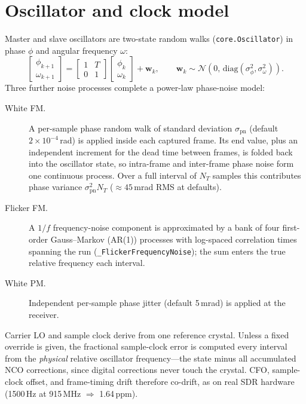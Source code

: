 \documentclass[10pt]{article}
\newcommand{\code}[1]{\texttt{#1}}
\begin{document}
\section{Oscillator and clock model}
Master and slave oscillators are two-state random walks
(\code{core.Oscillator}) in phase $\phi$ and angular frequency $\omega$:
\begin{equation}
\begin{bmatrix}\phi_{k+1}\\ \omega_{k+1}\end{bmatrix} =
\begin{bmatrix}1 & T\\ 0 & 1\end{bmatrix}
\begin{bmatrix}\phi_{k}\\ \omega_{k}\end{bmatrix} + \mathbf{w}_k ,
\qquad \mathbf{w}_k \sim \mathcal{N}(0,\,\mathrm{diag}(\sigma_\phi^2, \sigma_\omega^2)).
\end{equation}
Three further noise processes complete a power-law phase-noise model:
\begin{description}
\item[White FM.] A per-sample phase random walk of standard deviation
$\sigma_{\mathrm{pn}}$ (default $2\times10^{-4}$\,rad) is applied inside each
captured frame. Its end value, plus an independent increment for the dead
time between frames, is folded back into the oscillator state, so intra-frame
and inter-frame phase noise form one continuous process. Over a full interval
of $N_T$ samples this contributes phase variance
$\sigma_{\mathrm{pn}}^2 N_T$ ($\approx 45$\,mrad RMS at defaults).
\item[Flicker FM.] A $1/f$ frequency-noise component is approximated by a
bank of four first-order Gauss--Markov (AR(1)) processes with log-spaced
correlation times spanning the run (\code{\_FlickerFrequencyNoise}); the sum
enters the true relative frequency each interval.
\item[White PM.] Independent per-sample phase jitter (default 5\,mrad) is
applied at the receiver.
\end{description}
Carrier LO and sample clock derive from one reference crystal. Unless a
fixed override is given, the fractional sample-clock error is computed every
interval from the \emph{physical} relative oscillator frequency---the state
minus all accumulated NCO corrections, since digital corrections never touch
the crystal. CFO, sample-clock offset, and frame-timing drift therefore
co-drift, as on real SDR hardware (1500\,Hz at 915\,MHz $\Rightarrow$
1.64\,ppm).
\end{document}

